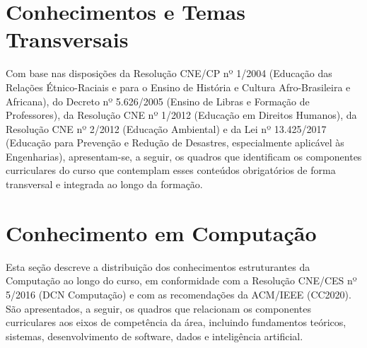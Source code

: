 













\section{Conhecimentos e Temas Transversais}

Com base nas disposições da Resolução CNE/CP nº 1/2004 (Educação das Relações Étnico-Raciais e para o Ensino de História e Cultura Afro-Brasileira e Africana), do Decreto nº 5.626/2005 (Ensino de Libras e Formação de Professores), da Resolução CNE nº 1/2012 (Educação em Direitos Humanos), da Resolução CNE nº 2/2012 (Educação Ambiental) e da Lei nº 13.425/2017 (Educação para Prevenção e Redução de Desastres, especialmente aplicável às Engenharias), apresentam-se, a seguir, os quadros que identificam os componentes curriculares do curso que contemplam esses conteúdos obrigatórios de forma transversal e integrada ao longo da formação.












\section{Conhecimento em Computação}

Esta seção descreve a distribuição dos conhecimentos estruturantes da Computação ao longo do curso, em conformidade com a Resolução CNE/CES nº 5/2016 (DCN Computação) e com as recomendações da ACM/IEEE (CC2020). São apresentados, a seguir, os quadros que relacionam os componentes curriculares aos eixos de competência da área, incluindo fundamentos teóricos, sistemas, desenvolvimento de software, dados e inteligência artificial.

